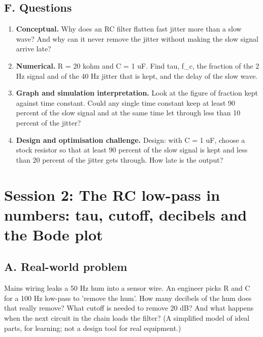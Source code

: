 \documentclass[11pt,a4paper]{article}
\begin{document}
\subsection*{F. Questions}
\begin{enumerate}[nosep]
\item \textbf{Conceptual.} Why does an RC filter flatten fast jitter more than a slow wave? And why can it never remove the jitter without making the slow signal arrive late?
\item \textbf{Numerical.} R = 20 kohm and C = 1 uF. Find tau, f\_c, the fraction of the 2 Hz signal and of the 40 Hz jitter that is kept, and the delay of the slow wave.
\item \textbf{Graph and simulation interpretation.} Look at the figure of fraction kept against time constant. Could any single time constant keep at least 90 percent of the slow signal and at the same time let through less than 10 percent of the jitter?
\item \textbf{Design and optimisation challenge.} Design: with C = 1 uF, choose a stock resistor so that at least 90 percent of the slow signal is kept and less than 20 percent of the jitter gets through. How late is the output?
\end{enumerate}

\section{Session 2: The RC low-pass in numbers: tau, cutoff, decibels and the Bode plot}

\subsection*{A. Real-world problem}
Mains wiring leaks a 50 Hz hum into a sensor wire. An engineer picks R and C for a 100 Hz low-pass to 'remove the hum'. How many decibels of the hum does that really remove? What cutoff is needed to remove 20 dB? And what happens when the next circuit in the chain loads the filter? (A simplified model of ideal parts, for learning; not a design tool for real equipment.)
\end{document}
